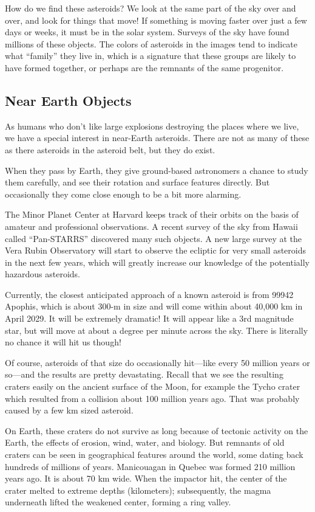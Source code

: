 \documentclass[12pt, preprint]{aastex}
\begin{document}
How do we find these asteroids? We look at the same part of the sky
over and over, and look for things that move! If something is moving
faster over just a few days or weeks, it must be in the solar
system. Surveys of the sky have found millions of these objects.  The
colors of asteroids in the images tend to indicate what ``family''
they live in, which is a signature that these groups are likely to
have formed together, or perhaps are the remnants of the same
progenitor.

\subsection{Near Earth Objects}

As humans who don't like large explosions destroying the places where
we live, we have a special interest in near-Earth asteroids. There are
not as many of these as there asteroids in the asteroid belt, but they
do exist.

When they pass by Earth, they give ground-based astronomers a chance
to study them carefully, and see their rotation and surface features
directly. But occasionally they come close enough to be a bit more
alarming. 

The Minor Planet Center at Harvard keeps track of their orbits on the
basis of amateur and professional observations. A recent survey of the
sky from Hawaii called ``Pan-STARRS'' discovered many such objects. A
new large survey at the Vera Rubin Observatory will start to observe
the ecliptic for very small asteroids in the next few years, which
will greatly increase our knowledge of the potentially hazardous
asteroids.

Currently, the closest anticipated approach of a known asteroid is
from 99942 Apophis, which is about 300-m in size and will come within
about 40,000 km in April 2029. It will be extremely dramatic! It will
appear like a 3rd magnitude star, but will move at about a degree per
minute across the sky. There is literally no chance it will hit us
though! 

Of course, asteroids of that size do occasionally hit---like every 50
million years or so---and the results are pretty devastating. Recall
that we see the resulting craters easily on the ancient surface of the
Moon, for example the Tycho crater which resulted from a collision
about 100 million years ago. That was probably caused by a few km
sized asteroid.

On Earth, these craters do not survive as long because of tectonic
activity on the Earth, the effects of erosion, wind, water, and
biology.  But remnants of old craters can be seen in geographical
features around the world, some dating back hundreds of millions of
years. Manicouagan in Quebec was formed 210 million years ago. It is
about 70 km wide. When the impactor hit, the center of the crater
melted to extreme depths (kilometers); subsequently, the magma
underneath lifted the weakened center, forming a ring valley.
\end{document}
